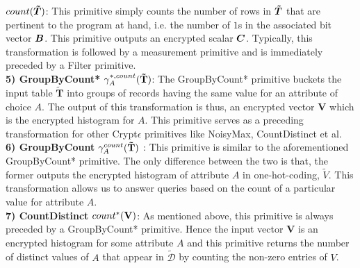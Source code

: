  
 $count(\boldsymbol{\tilde{T}})$: This primitive simply counts the number of rows in $\boldsymbol{\tilde{T}}$ that are pertinent to the program at hand, i.e. the number of $1$s in the associated bit vector $\boldsymbol{B}$.  This primitive outputs an encrypted scalar $\boldsymbol{C}$. Typically, this transformation is followed by a measurement primitive and is immediately preceded by a \textsf{Filter} primitive. \\
    \textbf{5) \textsf{GroupByCount* }} $\gamma^{*,count}_{A}(\mathbf{\tilde{T}})$: The  \textsf{GroupByCount*} primitive buckets the input table $\mathbf{\tilde{T}}$ into groups of records having the same value for an attribute of choice $A$. The output of this transformation is thus, an encrypted  vector $\mathbf{V}$ which is the encrypted histogram for $A$.
    This primitive serves as a preceding transformation for other Crypt$\epsilon$ primitives like \textsf{NoisyMax}, \textsf{CountDistinct} et al.\\
      \textbf{6) \textsf{GroupByCount}} $\gamma^{count}_{A}(\mathbf{\tilde{T}})$ : This primitive is similar to the aforementioned \textsf{GroupByCount*} primitive. The only difference between the two is that, the former outputs the encrypted histogram of attribute $A$ in one-hot-coding, $\tilde{V}$.  This transformation allows us to answer queries based on the count of a particular value for attribute $A$.\\
      \textbf{7) \textsf{CountDistinct } }$count^*(\mathbf{V})$: As mentioned above, this primitive is always preceded by a \textsf{GroupByCount*} primitive. Hence the input vector $\mathbf{V}$ is an encrypted histogram for some attribute $A$ and this primitive returns the number of distinct values of $A$ that appear in  $\boldsymbol{\tilde{\mathcal{D}}}$ by counting the non-zero entries of $V$.  




